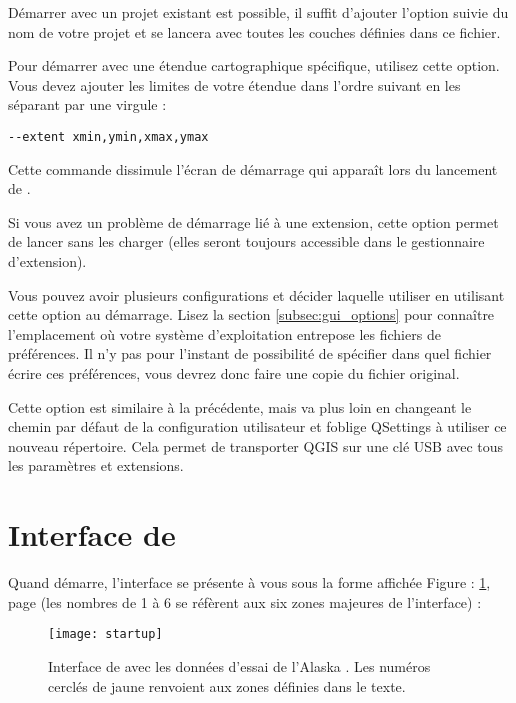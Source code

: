 Démarrer \qg avec un projet existant est possible, il suffit d'ajouter l'option  suivie du nom de votre projet et \qg se lancera avec toutes les couches définies dans ce fichier.

Pour démarrer avec une étendue cartographique spécifique, utilisez cette option. Vous devez ajouter les limites de votre étendue dans l'ordre suivant en les séparant par une virgule :
\begin{verbatim}
--extent xmin,ymin,xmax,ymax
\end{verbatim}

Cette commande dissimule l'écran de démarrage qui apparaît lors du lancement de \qg.

Si vous avez un problème de démarrage lié à une extension, cette option permet de lancer \qg sans les charger (elles seront toujours accessible dans le gestionnaire d'extension).

Vous pouvez avoir plusieurs configurations et décider laquelle utiliser en utilisant cette option au démarrage. Lisez la section \ref{subsec:gui_options} pour connaître l'emplacement où votre système d'exploitation entrepose les fichiers de préférences. Il n'y pas pour l'instant de possibilité de spécifier dans quel fichier écrire ces préférences, vous devrez donc faire une copie du fichier original.

Cette option est similaire à la précédente, mais va plus loin en changeant le chemin par défaut de la configuration utilisateur et foblige QSettings à utiliser ce nouveau répertoire. Cela permet de transporter QGIS sur une clé USB avec tous les paramètres et extensions.

\section{Interface de \qg} 
\label{label_qgismainwindow}

Quand \qg démarre, l'interface se présente à vous sous la forme affichée Figure : \ref{fig:startup}, page \pageref{fig:startup} (les nombres de 1 à 6 se réfèrent aux six zones majeures de l'interface) :

\begin{figure}[ht]
   \centering
   \texttt{[image: startup]}
   \caption{Interface de \qg avec les données d'essai de l'Alaska \nixcaption. Les numéros cerclés de jaune renvoient aux zones définies dans le texte.} \label{fig:startup}
\end{figure}

